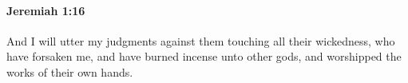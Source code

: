 
		\paragraph{Jeremiah 1:16} %
			\label{JEREMIAH-1-16}

			And I will utter my judgments against them touching all their wickedness, who have forsaken me, and have burned incense unto other gods, and worshipped the works of their own hands.



